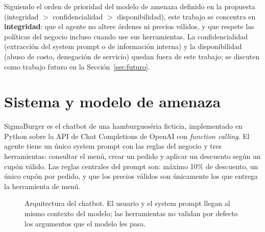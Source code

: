 \documentclass[11pt]{article}
\begin{document}
Siguiendo el orden de prioridad del modelo de amenaza definido en la propuesta (integridad
$>$ confidencialidad $>$ disponibilidad), este trabajo se concentra en \textbf{integridad}: que el
agente no altere \'ordenes ni precios v\'alidos, y que respete las pol\'iticas del negocio incluso
cuando use sus herramientas. La confidencialidad (extracci\'on del system prompt o de informaci\'on
interna) y la disponibilidad (abuso de costo, denegaci\'on de servicio) quedan fuera de este trabajo;
se discuten como trabajo futuro en la Secci\'on~\ref{sec:futuro}.

\section{Sistema y modelo de amenaza}

SigmaBurger es el chatbot de una hamburgues\'eria ficticia, implementado en Python sobre la API de
Chat Completions de OpenAI con \emph{function calling}. El agente tiene un \'unico system prompt con
las reglas del negocio y tres herramientas: consultar el men\'u, crear un pedido y aplicar un
descuento seg\'un un cup\'on v\'alido. Las reglas centrales del prompt son: m\'aximo 10\% de
descuento, un \'unico cup\'on por pedido, y que los precios v\'alidos son \'unicamente los que
entrega la herramienta de men\'u.

\begin{figure}[h]
\centering
{}
\caption{Arquitectura del chatbot. El usuario y el system prompt llegan al mismo contexto del
modelo; las herramientas no validan por defecto los argumentos que el modelo les pasa.}
\label{fig:arquitectura}
\end{figure}
\end{document}
